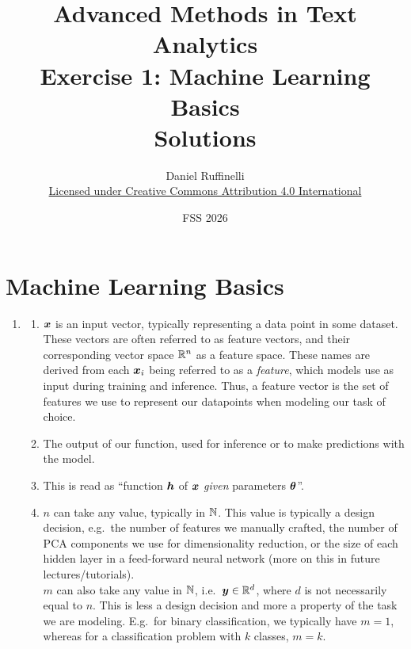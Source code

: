 \documentclass[11pt,a4paper]{article}
\title{Advanced Methods in Text Analytics \\ 
Exercise 1: Machine Learning Basics \\ 
\textbf{Solutions}}
\author{Daniel Ruffinelli \\ \href{https://creativecommons.org/licenses/by/4.0/}{Licensed under Creative Commons Attribution 4.0 International}}
\date{FSS 2026}
\begin{document}
\maketitle

\section{Machine Learning Basics}

\begin{enumerate}[label=(\alph*)]
    \item
          \begin{enumerate}[label=(\roman*)]
              \item ${\boldsymbol{x}}$ is an input vector, typically representing a data
                    point in some dataset. These vectors are often referred to
                    as feature vectors, and their corresponding vector space
                    $\mathbb{R}^n$ as a feature space.
                    These names are derived from each ${\boldsymbol{x}}_i$ being referred to
                    as a \emph{feature}, which models use as input during
                    training and inference.
                    Thus, a feature vector is the set of features we use to
                    represent our datapoints when modeling our task of choice.
              \item The output of our function, used for inference or to make
                    predictions with the model.
              \item This is read as ``function ${\boldsymbol{h}}$ of ${\boldsymbol{x}}$ \emph{given}
                    parameters ${\boldsymbol{\theta}}$''.
              \item $n$ can take any value, typically in $\mathbb{N}$. This value is
                    typically a design decision, e.g.\ the number of features we
                    manually crafted, the number of PCA components we use for
                    dimensionality reduction, or the size of each hidden layer
                    in a feed-forward neural network (more on this in future
                    lectures/tutorials). \\
                    $m$ can also take any value in $\mathbb{N}$, i.e.\
                    ${\boldsymbol{y}}\in\mathbb{R}^d$, where $d$ is not necessarily equal to
                    $n$. This is less a design decision and more a property of
                    the task we are modeling. E.g.\ for binary classification,
                    we typically have $m=1$, whereas for a classification
                    problem with $k$ classes, $m=k$.

\end{enumerate}
\end{enumerate}
\end{document}

